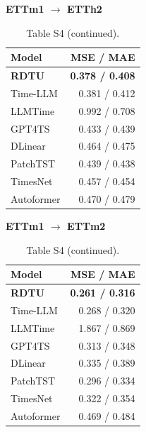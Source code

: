\begin{table}[H]\centering\small
\caption*{Table S4 (continued).}
\begin{minipage}[t]{0.48\linewidth}\vspace{0pt}\centering\small
\textbf{ETTm1 $\to$ ETTh2}\par\smallskip
\begin{tabular}{lr}\toprule Model & MSE / MAE\\\midrule
\rowcolor{blue!5}
\textbf{RDTU} & \textbf{0.378 / 0.408}\\
Time-LLM & 0.381 / 0.412\\
LLMTime & 0.992 / 0.708\\
GPT4TS & 0.433 / 0.439\\
DLinear & 0.464 / 0.475\\
PatchTST & 0.439 / 0.438\\
TimesNet & 0.457 / 0.454\\
Autoformer & 0.470 / 0.479\\
\bottomrule\end{tabular}\end{minipage}\hfill\begin{minipage}[t]{0.48\linewidth}\vspace{0pt}\centering\small
\textbf{ETTm1 $\to$ ETTm2}\par\smallskip
\begin{tabular}{lr}\toprule Model & MSE / MAE\\\midrule
\rowcolor{blue!5}
\textbf{RDTU} & \textbf{0.261 / 0.316}\\
Time-LLM & 0.268 / 0.320\\
LLMTime & 1.867 / 0.869\\
GPT4TS & 0.313 / 0.348\\
DLinear & 0.335 / 0.389\\
PatchTST & 0.296 / 0.334\\
TimesNet & 0.322 / 0.354\\
Autoformer & 0.469 / 0.484\\
\bottomrule\end{tabular}\end{minipage}
\end{table}
